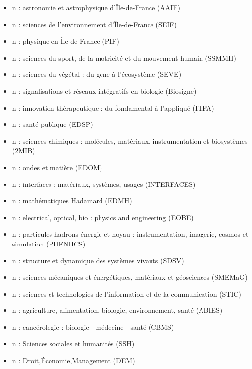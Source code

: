 \documentclass[french,12pt,a4paper]{book}
\begin{document}
\begin{itemize}
	\renewcommand{\labelitemi}{$\bullet$}
	\item n : astronomie et astrophysique d'Île-de-France (AAIF)
	\item n : sciences de l'environnement d’Île-de-France (SEIF)
	\item n : physique en Île-de-France (PIF)
	\item n : sciences du sport, de la motricité et du mouvement humain (SSMMH)
	\item n : sciences du végétal : du gène à l'écosystème (SEVE)
	\item n : signalisations et réseaux intégratifs en biologie (Biosigne)
	\item n : innovation thérapeutique : du fondamental à l'appliqué (ITFA)
	\item n : santé publique (EDSP)
	\item n : sciences chimiques : molécules, matériaux, instrumentation et biosystèmes (2MIB)
	\item n : ondes et matière (EDOM)
	\item n : interfaces : matériaux, systèmes, usages (INTERFACES)
	\item n : mathématiques Hadamard (EDMH)
	\item n : electrical, optical, bio : physics and engineering  (EOBE)
	\item n : particules hadrons énergie et noyau : instrumentation, imagerie, cosmos et simulation (PHENIICS)
	\item n : structure et dynamique des systèmes vivants (SDSV)
	\item n : sciences mécaniques et énergétiques, matériaux et géosciences  (SMEMaG)
	\item n : sciences et technologies de l'information et de la communication (STIC)
	\item n : agriculture, alimentation, biologie, environnement, santé (ABIES)
	\item n : cancérologie : biologie - médecine - santé (CBMS)
	\item n : Sciences sociales et humanités (SSH)
	\item n : Droit,Économie,Management (DEM)
\end{itemize}
\end{document}
